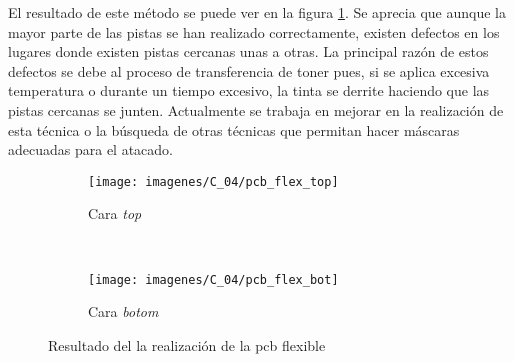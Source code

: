El resultado de este método se puede ver en la figura \ref{fig:pcb_flex}. Se aprecia que aunque la mayor parte de las pistas se han realizado correctamente, existen defectos en los lugares donde existen pistas cercanas unas a otras. La principal razón de estos defectos se debe al proceso de transferencia de toner pues, si se aplica excesiva temperatura o durante un tiempo excesivo, la tinta se derrite haciendo que las pistas cercanas se junten. Actualmente se trabaja en mejorar en la realización de esta técnica o la búsqueda de otras técnicas que permitan hacer máscaras adecuadas para el atacado. 

\begin{figure}[!ht]
\center
\begin{subfigure}[b]{0.5\textwidth}
\center
\texttt{[image: imagenes/C\_04/pcb\_flex\_top]}
\caption{Cara \textit{top}}
\end{subfigure}
\\
\begin{subfigure}[b]{0.5\textwidth}
\center
\texttt{[image: imagenes/C\_04/pcb\_flex\_bot]}
\caption{Cara \textit{botom}}
\end{subfigure}
\caption{Resultado del la realización de la \acrshort{pcb} flexible}
\label{fig:pcb_flex}
\end{figure}












